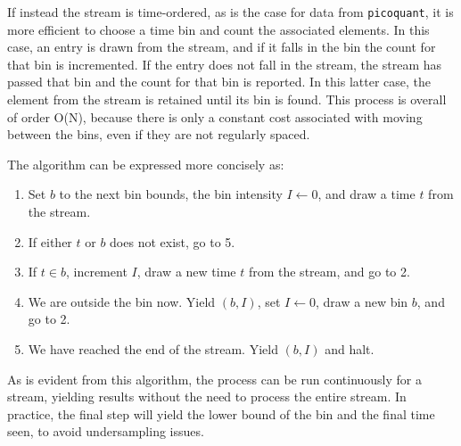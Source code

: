 \documentclass{article}
\newcommand{\picoquant}{\texttt{picoquant}}
\begin{document}
If instead the stream is time-ordered, as is the case for data from \picoquant, it is more efficient to choose a time bin and count the associated elements. In this case, an entry is drawn from the stream, and if it falls in the bin the count for that bin is incremented. If the entry does not fall in the stream, the stream has passed that bin and the count for that bin is reported. In this latter case, the element from the stream is retained until its bin is found. This process is overall of order O(N), because there is only a constant cost associated with moving between the bins, even if they are not regularly spaced.

The algorithm can be expressed more concisely as:
\begin{enumerate}
\item Set $b$ to the next bin bounds, the bin intensity $I\leftarrow 0$, and draw a time $t$ from the stream.
\item If either $t$ or $b$ does not exist, go to 5. 
\item If $t\in b$, increment $I$, draw a new time $t$ from the stream, and go to 2.
\item We are outside the bin now. Yield $(b,I)$, set $I\leftarrow 0$, draw a new bin $b$, and go to 2.
\item We have reached the end of the stream. Yield $(b,I)$ and halt.
\end{enumerate}
%
%
As is evident from this algorithm, the process can be run continuously for a stream, yielding results without the need to process the entire stream. In practice, the final step will yield the lower bound of the bin and the final time seen, to avoid undersampling issues.
\end{document}
